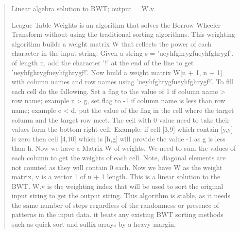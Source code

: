 \documentclass{article}
\begin{document}
\begin{quote}
\begin{center}Linear algebra solution to BWT; output = W.v\end{center}
League Table Weights is an algorithm that solves the Borrow Wheeler Transform without using the traditional sorting algorithms. This weighting algorithm builds a weight matrix W that reflects the power of each character in the input string. Given a string s = 'ueyhfghrygfueyhfghrygf', of length n, add the character '!' at the end of the line to get 'ueyhfghrygfueyhfghrygf!'. Now build a weight matrix W[n + 1, n + 1] with column names and row names using 'ueyhfghrygfueyhfghrygf!'. To fill each cell do the fallowing. Set a flag to the value of 1 if column name > row name; example r > g, set flag to -1 if column name is less than row name; example c < d, put the value of the flag in the cell where the target column and the target row meet. The cell with 0 value need to take their values form the bottom right cell. Example: if cell [3,9] which contain [y,y] is zero then cell [4,10] which is [h,g] will provide the value -1 as g is less than h. Now we have a Matrix W of weights. We need to sum the values of each column to get the weights of each cell. Note, diagonal elements are not counted as they will contain 0 each. Now we have W as the weight matrix, v is a vector 1 of n + 1 length. This is a linear solution to the BWT. W.v is the weighting index that will be used to sort the original input string to get the output string.  This algorithm is stable, as it needs the same number of steps regardless of the randomness or presence of patterns in the input data.  it beats any existing BWT sorting methods such as quick sort and suffix arrays by a heavy margin.
\end{quote}
\end{document}
